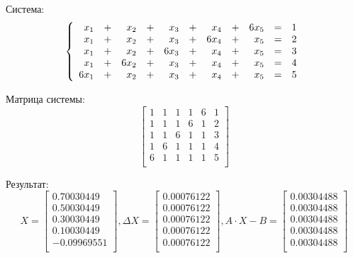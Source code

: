\documentclass[11pt]{article}
\begin{document}
    Система:
    \[
        \left\{
        \begin{array}{*{5}{r@{}lc}l}
              & x_1 & + &   & x_2 & + &   & x_3 & + &   & x_4 & + & 6 & x_5 & = & 1 \\
              & x_1 & + &   & x_2 & + &   & x_3 & + & 6 & x_4 & + &   & x_5 & = & 2 \\
              & x_1 & + &   & x_2 & + & 6 & x_3 & + &   & x_4 & + &   & x_5 & = & 3 \\
              & x_1 & + & 6 & x_2 & + &   & x_3 & + &   & x_4 & + &   & x_5 & = & 4 \\
            6 & x_1 & + &   & x_2 & + &   & x_3 & + &   & x_4 & + &   & x_5 & = & 5 \\
        \end{array}
        \right.
    \]

    Матрица системы:
    \[
        \left[
        \begin{array}{ccccc|c}
            1 & 1 & 1 & 1 & 6 & 1 \\
            1 & 1 & 1 & 6 & 1 & 2 \\
            1 & 1 & 6 & 1 & 1 & 3 \\
            1 & 6 & 1 & 1 & 1 & 4 \\
            6 & 1 & 1 & 1 & 1 & 5 \\
        \end{array}
        \right]
    \]

    Результат:
    \[
        X=\left[
        \begin{array}{r}
             0.70030449 \\
             0.50030449 \\
             0.30030449 \\
             0.10030449 \\
            -0.09969551 \\
      \end{array}
        \right],
        \Delta X=\left[
        \begin{array}{r}
            0.00076122 \\
            0.00076122 \\
            0.00076122 \\
            0.00076122 \\
            0.00076122 \\
        \end{array}
        \right],
        A\cdot X-B=\left[
        \begin{array}{r}
            0.00304488 \\
            0.00304488 \\
            0.00304488 \\
            0.00304488 \\
            0.00304488 \\
        \end{array}
        \right]
    \]
\end{document}
